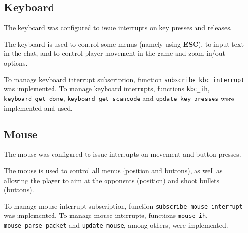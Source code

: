 \documentclass{article}
\theoremstyle{remark}
\begin{document}
\subsection{Keyboard}
The keyboard was configured to issue interrupts on key presses and releases. \par
The keyboard is used to control some menus (namely using \textbf{ESC}), to input text in the chat, and to control player movement in the game and zoom in/out options.\par
To manage keyboard interrupt subscription, function \texttt{subscribe\_kbc\_interrupt} was implemented. To manage keyboard interrupts, functions \texttt{kbc\_ih}, \texttt{keyboard\_get\_done}, \texttt{keyboard\_get\_scancode} and \linebreak \texttt{update\_key\_presses} were implemented and used. 
\subsection{Mouse}
The mouse was configured to issue interrupts on movement and button presses. \par
The mouse is used to control all menus (position and buttons), as well as allowing the player to aim at the opponents (position) and shoot bullets (buttons). \par
To manage mouse interrupt subscription, function \texttt{subscribe\_mouse\_interrupt} was implemented. To manage mouse interrupts, functions \texttt{mouse\_ih}, \texttt{mouse\_parse\_packet} and \texttt{update\_mouse}, among others, were implemented.
\end{document}
